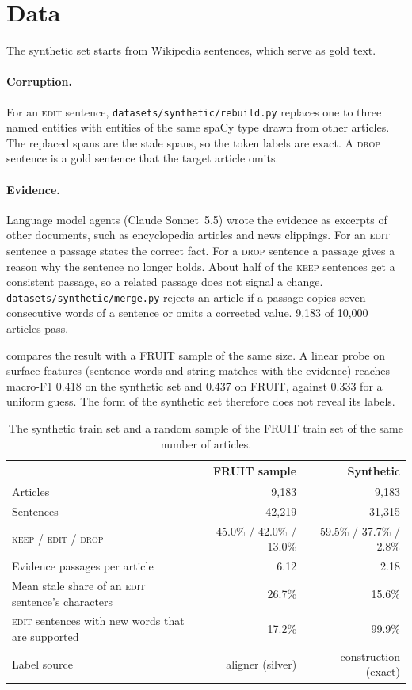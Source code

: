 \documentclass[]{paper}
\newcommand{\keep}{\textsc{keep}}
\newcommand{\edit}{\textsc{edit}}
\newcommand{\drop}{\textsc{drop}}
\begin{document}
\section{Data}
\label{sec:data}

The synthetic set starts from Wikipedia sentences, which serve as gold text.

\paragraph{Corruption.} For an \edit{} sentence, \texttt{datasets/synthetic/rebuild.py} replaces one to three named entities with entities of the same spaCy type drawn from other articles. The replaced spans are the stale spans, so the token labels are exact. A \drop{} sentence is a gold sentence that the target article omits.

\paragraph{Evidence.} Language model agents (Claude Sonnet~5.5) wrote the evidence as excerpts of other documents, such as encyclopedia articles and news clippings. For an \edit{} sentence a passage states the correct fact. For a \drop{} sentence a passage gives a reason why the sentence no longer holds. About half of the \keep{} sentences get a consistent passage, so a related passage does not signal a change. \texttt{datasets/synthetic/merge.py} rejects an article if a passage copies seven consecutive words of a sentence or omits a corrected value. 9,183 of 10,000 articles pass.

 compares the result with a FRUIT sample of the same size. A linear probe on surface features (sentence words and string matches with the evidence) reaches macro-F1 0.418 on the synthetic set and 0.437 on FRUIT, against 0.333 for a uniform guess. The form of the synthetic set therefore does not reveal its labels.

\begin{table}[H]
\caption{The synthetic train set and a random sample of the FRUIT train set of the same number of articles.}
\label{tab:data}
\centering
\footnotesize
\begin{tabular}{lrr}
\toprule
 & FRUIT sample & Synthetic \\
\midrule
Articles & 9,183 & 9,183 \\
Sentences & 42,219 & 31,315 \\
\quad\keep{} / \edit{} / \drop{} & 45.0\% / 42.0\% / 13.0\% & 59.5\% / 37.7\% / 2.8\% \\
Evidence passages per article & 6.12 & 2.18 \\
Mean stale share of an \edit{} sentence's characters & 26.7\% & 15.6\% \\
\edit{} sentences with new words that are supported & 17.2\% & 99.9\% \\
Label source & aligner (silver) & construction (exact) \\
\bottomrule
\end{tabular}
\end{table}
\end{document}
